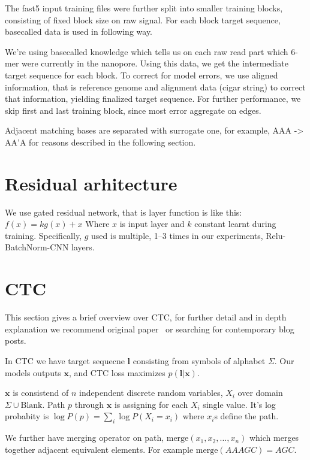\documentclass[runningheads,a4paper]{llncs}
\begin{document}
The fast5 input training files were further split into smaller training blocks, consisting of fixed block size on raw signal. For each block target sequence, basecalled data is used in following way.

We're using basecalled knowledge which tells us on each raw read part which 6-mer were currently in the nanopore. Using this data, we get the intermediate target sequence for each block. To correct for model errors, we use aligned information, that is reference genome and alignment data (cigar string) to correct that information, yielding finalized target sequence. For further performance, we skip first and last training block, since most error aggregate on edges.

Adjacent matching bases are separated with surrogate one, for example, AAA -> AA'A for reasons described in the following section.

\section{Residual arhitecture}

We use gated residual network, that is layer function is like this: $f(x) = k g(x) + x$ Where $x$ is input layer and $k$ constant learnt during training. Specifically, $g$ used is multiple, 1--3 times in our experiments, Relu-BatchNorm-CNN layers.

\section{CTC}

This section gives a brief overview over CTC, for further detail and in depth explanation we recommend original paper~\cite{graves2006connectionist} or searching for contemporary blog posts.

In CTC we have target sequecne $\mathbf{l}$ consisting from symbols of alphabet $\Sigma$. Our models outputs $\mathbf{x}$, and CTC loss maximizes $p(\mathbf{l}|\mathbf{x})$.

$\mathbf{x}$ is consistend of $n$ independent discrete random variables, $X_i$  over domain $\Sigma \cup \text{Blank}$. Path $p$ through $\mathbf{x}$ is assigning for each $X_i$ single value. It's log probabity is $\log P(p) = \sum_i {\log P(X_i=x_i)}$ where $x_i$s define the path.

We further have merging operator on path, $\text{merge}(x_1, x_2, \ldots, x_n)$ which merges together adjacent equivalent elements. For example $\text{merge}(AAAGC) = AGC$.
\end{document}
